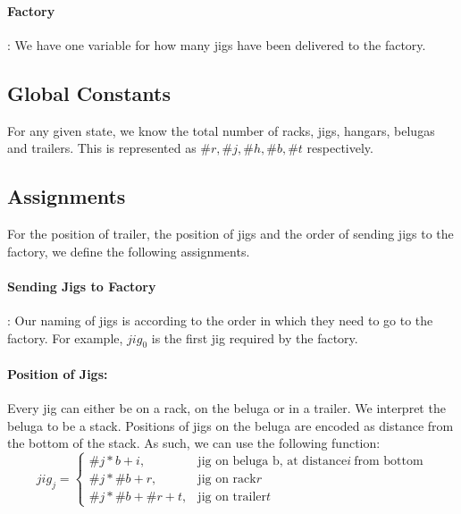 \documentclass{article}
\newcommand{\numRacks}[0]{\ensuremath{\# r}}
\newcommand{\numTrailers}[0]{\ensuremath{\# t}}
\newcommand{\numJigs}[0]{\ensuremath{\# j}}
\newcommand{\numHangars}[0]{\ensuremath{\# h}}
\newcommand{\numBelugas}[0]{\ensuremath{\# b}}
\begin{document}
\paragraph*{Factory}: We have one variable for how many jigs have been delivered to the factory.

\subsection{Global Constants}
For any given state, we know the total number of racks, jigs, hangars, belugas and trailers. This is represented as $\numRacks, \numJigs, \numHangars, \numBelugas, \numTrailers$ respectively.

\subsection{Assignments}
For the position of trailer, the position of jigs and the order of sending jigs to the factory, we define the following assignments.\\

\paragraph*{Sending Jigs to Factory}: Our naming of jigs is according to the order in which they need to go to the factory. For example, $jig_0$ is the first jig required by the factory.\\

\paragraph*{Position of Jigs:} Every jig can either be on a rack, on the beluga or in a trailer. We interpret the beluga to be a stack. Positions of jigs on the beluga are encoded as distance from the bottom of the stack. As such, we can use the following function:
\begin{equation*}
    jig_j =\begin{cases*}
        \numJigs*b + i, & \text{jig on beluga b, at distance} i ~\text{from bottom}\\
        \numJigs*\numBelugas + r, & \text{jig on rack} {r} \\
        \numJigs*\numBelugas + \numRacks + t, & \text{jig on trailer} {t}
        \end{cases*}
\end{equation*}
\end{document}
